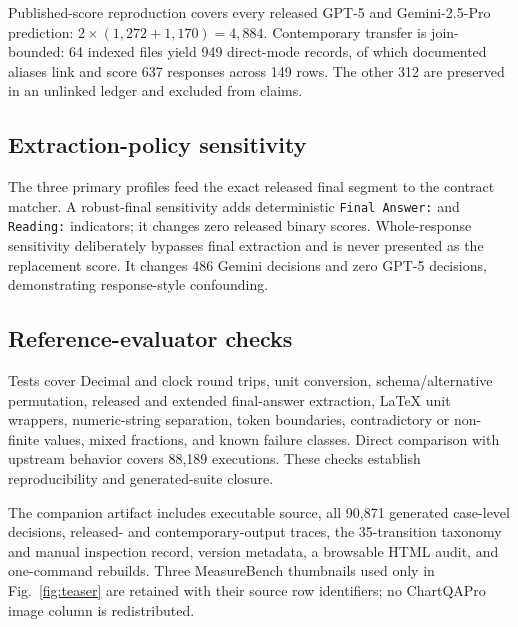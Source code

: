 Published-score reproduction covers every released GPT-5 and Gemini-2.5-Pro prediction: $2\times(1{,}272+1{,}170)=4{,}884$. Contemporary transfer is join-bounded: 64 indexed files yield 949 direct-mode records, of which documented aliases link and score 637 responses across 149 rows. The other 312 are preserved in an unlinked ledger and excluded from claims.

\subsection{Extraction-policy sensitivity}
The three primary profiles feed the exact released final segment to the contract matcher. A robust-final sensitivity adds deterministic \texttt{Final Answer:} and \texttt{Reading:} indicators; it changes zero released binary scores. Whole-response sensitivity deliberately bypasses final extraction and is never presented as the replacement score. It changes 486 Gemini decisions and zero GPT-5 decisions, demonstrating response-style confounding.

\subsection{Reference-evaluator checks}
Tests cover Decimal and clock round trips, unit conversion, schema/alternative permutation, released and extended final-answer extraction, LaTeX unit wrappers, numeric-string separation, token boundaries, contradictory or non-finite values, mixed fractions, and known failure classes. Direct comparison with upstream behavior covers 88,189 executions. These checks establish reproducibility and generated-suite closure.

The companion artifact includes executable source, all 90,871 generated case-level decisions, released- and contemporary-output traces, the 35-transition taxonomy and manual inspection record, version metadata, a browsable HTML audit, and one-command rebuilds. Three MeasureBench thumbnails used only in Fig.~\ref{fig:teaser} are retained with their source row identifiers; no ChartQAPro image column is redistributed.
